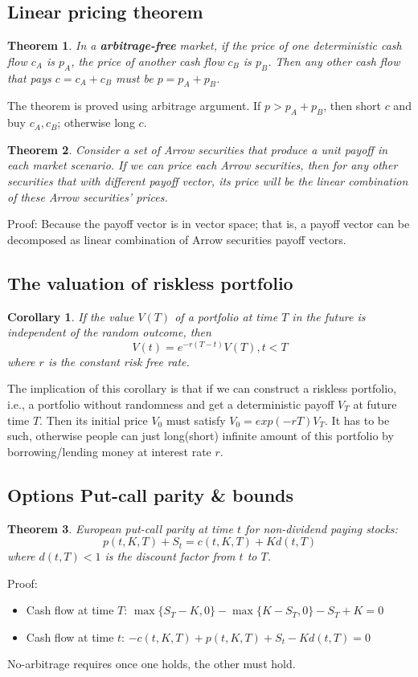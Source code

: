 \documentclass[a4paper,13pt]{report}
\newtheorem{theorem}{Theorem}[section]
\newtheorem{corollary}{Corollary}[theorem]
\begin{document}
\subsection{Linear pricing theorem}
\begin{theorem}
In a \textbf{arbitrage-free} market, if the price of one deterministic cash flow $c_A$ is $p_A$, the price of another cash flow $c_B$ is $p_B$. Then any other cash flow that pays $c=c_A + c_B$ must be $p=p_A+p_B$.
\end{theorem}
The theorem is proved using arbitrage argument. If $p > p_A + p_B$, then short $c$ and buy $c_A,c_B$; otherwise long $c$.

\begin{theorem}
Consider a set of Arrow securities that produce a unit payoff in each market scenario. If we can price each Arrow securities, then for any other securities that with different payoff vector, its price will be the linear combination of these Arrow securities' prices.  
\end{theorem}
Proof: Because the payoff vector is in vector space; that is, a payoff vector can be decomposed as linear combination of Arrow securities payoff vectors. 


\subsection{The valuation of riskless portfolio}
\begin{corollary}
If the value $V(T)$ of a portfolio at time $T$ in the future is independent of the random outcome, then $$V(t) = e^{-r(T-t)}V(T),t<T$$
where $r$ is the constant risk free rate. 
\end{corollary}

The implication of this corollary is that if we can construct a riskless portfolio, i.e., a portfolio without randomness and get a deterministic payoff $V_T$ at future time $T$. Then its initial price $V_0$ must satisfy $V_0=exp(-rT)V_T$. It has to be such, otherwise people can just long(short) infinite amount of this portfolio by borrowing/lending money at interest rate $r$.


\subsection{Options Put-call parity \& bounds}
\begin{theorem}
European put-call parity at time $t$ for non-dividend paying stocks:
$$p(t,K,T) + S_t = c(t,K,T)+K d(t,T)$$
where $d(t,T) < 1$ is the discount factor from $t$ to $T$.
\end{theorem}
Proof: 
\begin{itemize}
    \item Cash flow at time $T$: $\max\{S_T-K,0\}-\max\{K-S_T,0\}-S_T+K = 0$
    \item Cash flow at time $t$:
    $-c(t,K,T) + p(t,K,T) + S_t -Kd(t,T) = 0$
\end{itemize}
No-arbitrage requires once one holds, the other must hold.
\end{document}
